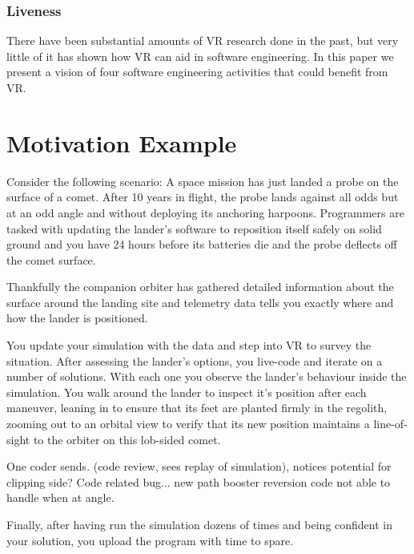 \documentclass[conference]{IEEEtran}
\begin{document}

\subsubsection{Liveness}



There have been substantial amounts of VR research done in the past, but very little of it has shown how VR can aid in software engineering. 
In this paper we present a vision of four software engineering activities that could benefit from VR.

\section{Motivation Example}

Consider the following scenario: A space mission has just landed a probe on the surface of a comet.
After 10 years in flight, the probe lands against all odds but at an odd angle and without deploying its anchoring harpoons. 
Programmers are tasked with updating the lander's software to reposition itself safely on solid ground and you have 24 hours before its batteries die and the probe deflects off the comet surface.

Thankfully the companion orbiter has gathered detailed information about the surface around the landing site and telemetry data tells you exactly where and how the lander is positioned. 

You update your simulation with the data and step into VR to survey the situation. 
After assessing the lander's options, you live-code and iterate on a number of solutions. 
With each one you observe the lander's behaviour inside the simulation. 
You walk around the lander to inspect it's position after each maneuver, leaning in to ensure that its feet are planted firmly in the regolith, zooming out to an orbital view to verify that its new position maintains a line-of-sight to the orbiter on this lob-sided comet. 

One coder sends. (code review, sees replay of simulation), notices potential for clipping side?  Code related bug... new path booster reversion code not able to handle when at angle.

Finally, after having run the simulation dozens of times and being confident in your solution, you upload the program with time to spare. 
\end{document}

